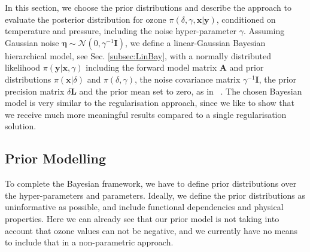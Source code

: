 
In this section, we choose the prior distributions and describe the approach to evaluate the posterior distribution for ozone $\pi(\delta, \gamma, \bm{x}|\bm{y})$, conditioned on temperature and pressure, including the noise hyper-parameter $\gamma$.
Assuming Gaussian noise $\bm{\eta} \sim \mathcal{N}(0, \gamma^{-1} \bm{I})$, we define a linear-Gaussian Bayesian hierarchical model, see Sec. \ref{subsec:LinBay},
with a normally distributed likelihood $\pi(\bm{y} |  \bm{x}, \gamma)$ including the forward model matrix $\bm{A}$ and prior distributions $\pi(\bm{x} |  \delta)$ and $\pi(\delta, \gamma)$, the noise covariance matrix $\gamma^{-1} \bm{I}$, the prior precision matrix $\delta \bm{L}$ and the prior mean set to zero, as in ~\cite{fox2016fast}.
The chosen Bayesian model is very similar to the regularisation approach, since we like to show that we receive much more meaningful results compared to a single regularisation solution.


\subsection{Prior Modelling}
To complete the Bayesian framework, we have to define prior distributions over the hyper-parameters and parameters.
Ideally, we define the prior distributions as uninformative as possible, and include functional dependencies and physical properties.
Here we can already see that our prior model is not taking into account that ozone values can not be negative, and we currently have no means to include that in a non-parametric approach.


